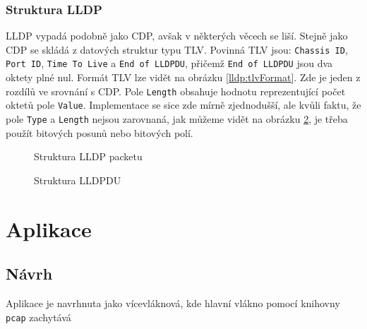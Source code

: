 \documentclass[a4paper,12pt]{article}
\begin{document}
			\subsubsection{Struktura LLDP}
				LLDP vypadá podobně jako CDP, avšak v některých věcech se liší. Stejně jako CDP se skládá z datových struktur typu TLV. Povinná TLV jsou: \texttt{Chassis ID}, \texttt{Port ID}, \texttt{Time To Live} a \texttt{End of LLDPDU}, přičemž \texttt{End of LLDPDU} jsou dva oktety plné nul. Formát TLV lze vidět na obrázku \ref{lldp:tlvFormat}. Zde je jeden z rozdílů ve srovnání s CDP. Pole \texttt{Length} obsahuje hodnotu reprezentující počet oktetů pole \texttt{Value}. Implementace se sice zde mírně zjednodušší, ale kvůli faktu, že pole \texttt{Type} a \texttt{Length} nejsou zarovnaná, jak můžeme vidět na obrázku \ref{pic:lldpTlvStructure}, je třeba použít bitových posunů nebo bitových polí.
				
				\begin{figure}[h]	
					\begin{center}
						\caption{Struktura LLDP packetu}
						\label{pic:lldpStructure}
					\end{center}
				\end{figure}
				
				\begin{figure}[h]	
					\begin{center}
						\caption{Struktura LLDPDU}
						\label{pic:lldpTlvStructure}
					\end{center}
				\end{figure}
			
	\section{Aplikace}
	\subsection{Návrh}
		Aplikace je navrhnuta jako vícevláknová, kde hlavní vlákno pomocí knihovny \texttt{pcap} zachytává
			
	\pagebreak	
	\listoffigures
	\listoftables
	\pagebreak

	
	
\end{document}
